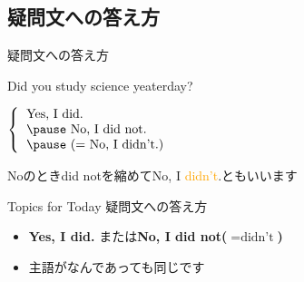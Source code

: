 \documentclass[handout,aspectratio=169,xcolor={dvipsnames,table}]{beamer}
\newcommand{\myaudio}[1]{\href{#1}{\faVolumeUp}}
\begin{document}
\subsection{疑問文への答え方}
 \begin{frame}[plain]{疑問文への答え方}
 \Large
\pause

Did  you study science yeaterday?

\vspace{20pt}
\pause

\mbox{}\hspace{100pt}$\left\{\begin{tabular}{l}
         \text{Yes, I did.}\\\pause
         \text{No, I did not.}\\\pause
         \text{(}= \text{No, I didn't.)}
        \end{tabular}\right.$

\pause

\mbox{}\hfill{}{\small Noのときdid notを縮めてNo, I \textcolor{orange}{didn't}.ともいいます}\,\,\myaudio{./audio/027_past_did_you_03.mp3}

\begin{exampleblock}{Topics for Today}
\small
疑問文への答え方
\begin{itemize}
 \item  \textcolor{NavyBlue}{\bfseries Yes, I did.} または\textcolor{NavyBlue}{\bfseries No, I did not($=\text{didn't}$)}
 \item  主語がなんであっても同じです
\end{itemize}
      \end{exampleblock}

\end{frame}
\end{document}

